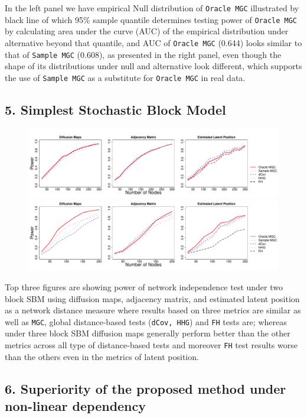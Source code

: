 \documentclass[12pt]{article}
\begin{document}
In the left panel we have empirical Null distribution of \texttt{Oracle MGC} illustrated by black line of which 95$\%$ sample quantile determines testing power of \texttt{Oracle MGC} by calculating area under the curve (AUC) of the empirical distribution under alternative beyond that quantile, and AUC of \texttt{Oracle MGC} (0.644) looks similar to that of \texttt{Sample MGC} (0.608), as presented in the right panel, even though the shape of its distributions under null and alternative look different, which supports the use of \texttt{Sample MGC} as a substitute for \texttt{Oracle MGC} in real data.
 
\subsection*{5. Simplest Stochastic Block Model}
 
\begin{figure}[h]
	\centering
	\includegraphics[width=6in]{../Figure/twoSBM.pdf}
	\includegraphics[width=6in]{../Figure/ThreeSBM.pdf}
\end{figure}

Top three figures are showing power of network independence test  under two block SBM using diffusion maps, adjacency matrix, and estimated latent position as a network distance measure where results based on three metrics are similar as well as \texttt{MGC}, global distance-based tests (\texttt{dCov, HHG}) and \texttt{FH} tests are; whereas under three block SBM diffusion maps generally perform better than the other metrics across all type of distance-based tests and moreover \texttt{FH} test results worse than the others even in the metrics of latent position.

\subsection*{6. Superiority of the proposed method under non-linear dependency}
\end{document}
